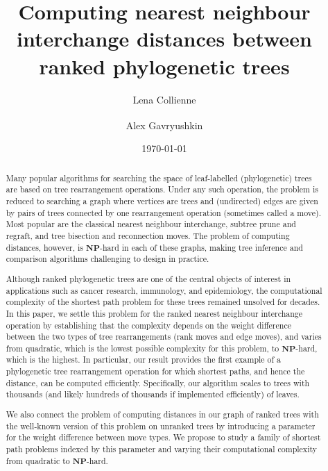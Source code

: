 \documentclass[11pt]{amsart}
\title[Computing $\rnni$ distance]{Computing nearest neighbour interchange distances between ranked phylogenetic trees}
\date{\today}
\author{Lena Collienne}
\author{Alex Gavryushkin\textsuperscript{\Letter}}
\newcommand{\np}{\mathbf{NP}}
\begin{document}
\begin{abstract}
Many popular algorithms for searching the space of leaf-labelled (phylogenetic) trees are based on tree rearrangement operations.
Under any such operation, the problem is reduced to searching a graph where vertices are trees and (undirected) edges are given by pairs of trees connected by one rearrangement operation (sometimes called a move).
Most popular are the classical nearest neighbour interchange, subtree prune and regraft, and tree bisection and reconnection moves.
The problem of computing distances, however, is $\np$-hard in each of these graphs, making tree inference and comparison algorithms challenging to design in practice.

Although ranked phylogenetic trees are one of the central objects of interest in applications such as cancer research, immunology, and epidemiology, the computational complexity of the shortest path problem for these trees remained unsolved for decades.
In this paper, we settle this problem for the ranked nearest neighbour interchange operation by establishing that the complexity depends on the weight difference between the two types of tree rearrangements (rank moves and edge moves), and varies from quadratic, which is the lowest possible complexity for this problem, to $\np$-hard, which is the highest.
In particular, our result provides the first example of a phylogenetic tree rearrangement operation for which shortest paths, and hence the distance, can be computed efficiently.
Specifically, our algorithm scales to trees with thousands (and likely hundreds of thousands if implemented efficiently) of leaves.

We also connect the problem of computing distances in our graph of ranked trees with the well-known version of this problem on unranked trees by introducing a parameter for the weight difference between move types.
We propose to study a family of shortest path problems indexed by this parameter and varying their computational complexity from quadratic to $\np$-hard.
\end{abstract}


\maketitle
\newpage
\end{document}
